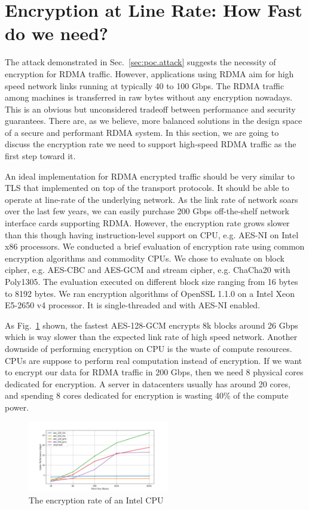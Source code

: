 \section{Encryption at Line Rate: How Fast do we need?}
\label{sec:encrypt}

The attack demonstrated in Sec.~\ref{sec:poc.attack} suggests the necessity of encryption for RDMA traffic.
However, applications using RDMA aim for high speed network links running at typically 40 to 100 Gbps.
The RDMA traffic among machines is transferred in raw bytes without any encryption nowadays.
This is an obvious but unconsidered tradeoff between performance and security guarantees.
There are, as we believe, more balanced solutions in the design space of a secure and performant RDMA system.
In this section, we are going to discuss the encryption rate we need to support high-speed RDMA traffic
as the first step toward it.

An ideal implementation for RDMA encrypted traffic should be very similar to TLS that implemented on top of the transport protocols. It should be able to operate at line-rate of the underlying network. As the link rate of network soars over the last few years, we can easily purchase 200 Gbps off-the-shelf network interface cards supporting RDMA. However, the encryption rate grows slower than this though having instruction-level support on CPU, e.g. AES-NI on Intel x86 processors. We conducted a brief evaluation of encryption rate using common encryption algorithms and commodity CPUs. We chose to evaluate on block cipher, e.g. AES-CBC and AES-GCM and stream cipher, e.g. ChaCha20 with Poly1305. The evaluation executed on different block size ranging from 16 bytes to 8192 bytes. We ran encryption algorithms of OpenSSL 1.1.0 on a Intel Xeon E5-2650 v4 processor. It is single-threaded and with AES-NI enabled.

As Fig.~\ref{fig:cpu_encryption_rate} shown, the fastest AES-128-GCM encrypts 8k blocks around 26 Gbps which is way slower than the expected link rate of high speed network. Another downside of performing encryption on CPU is the waste of compute resources. CPUs are suppose to perform real computation instead of encryption. If we want to encrypt our data for RDMA traffic in 200 Gbps, then we need 8 physical cores dedicated for encryption. A server in datacenters usually has around 20 cores, and spending 8 cores dedicated for encryption is wasting 40\% of the compute power.

\begin{figure}[ht]
    \centering
    \includegraphics[width=0.55\textwidth]{fig/encryption}
    \caption{The encryption rate of an Intel CPU}
    \label{fig:cpu_encryption_rate}
\end{figure}

